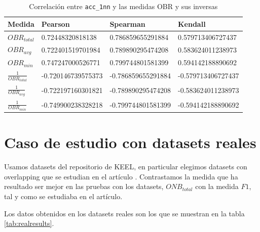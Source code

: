\documentclass[a4paper,12pt]{report}
\theoremstyle{definition}
\begin{document}
\begin{table}
  \centering
  \begin{tabular}{ l l l l }
    Medida & Pearson & Spearman & Kendall \\ \hline
    $OBR_{total}$ & 0.72448320818138 & 0.786859655291884 & 0.579713406727437 \\
    $OBR_{avg}$ & 0.722401519701984 & 0.789890295474208 & 0.583624011238973 \\
    $OBR_{min}$ & 0.747247000526771 & 0.799744801581399 & 0.594142188890692 \\
    $\frac{1}{OBR_{total}}$ & -0.720146739575373 & -0.786859655291884 & -0.579713406727437 \\
    $\frac{1}{OBR_{avg}}$ & -0.722197160301821 & -0.789890295474208 & -0.583624011238973 \\
    $\frac{1}{OBR_{min}}$ & -0.749900238328218 & -0.799744801581399 & -0.594142188890692 \\
  \end{tabular}
  \caption{Correlación entre \texttt{acc\_1nn} y las medidas OBR y sus inversas}
  \label{tab:obr}
\end{table}

\section{Caso de estudio con datasets reales}
\label{sec:real}
Usamos datasets del repositorio de KEEL\cite{alcala2011keel}, en particular elegimos datasets con overlapping que se estudian en el artículo \cite{garcia2009diagnose}.
Contrastamos la medida que ha resultado ser mejor en las pruebas con los datasets, $ONB_{total}$ con la medida $F1$, tal y como se estudiaba en el artículo.

Los datos obtenidos en los datasets reales son los que se muestran en la tabla \ref{tab:realresults}.
\end{document}
